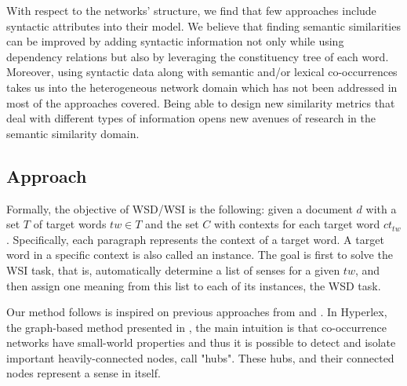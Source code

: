 With respect to the networks' structure, we find that few approaches include syntactic attributes into their model. We believe that finding semantic similarities can be improved by adding syntactic information not only  while using dependency relations but also by leveraging the constituency tree of each word. Moreover, using syntactic data along with semantic and/or lexical co-occurrences takes us into the heterogeneous network domain which has not been addressed in most of the approaches covered.
Being able to design new similarity metrics that deal with different types of information opens new avenues of research in the semantic similarity domain. %




\subsection{Approach}
	


Formally, the objective of WSD/WSI is the following: given a document $d$ with a set $T$ of  target words $tw \in T$ and the set $C$ with contexts for each target word $ct_{tw}$. 
Specifically, each paragraph represents the context  of a target word. A target word in a specific context is also called an instance.
The goal is first to solve the WSI task, that is, automatically determine a list of senses for a given $tw$, and then assign one meaning from this list to each of its instances, the WSD task.
%


Our method follows is inspired on previous approaches from \cite{2004.Veronis} and \cite{2007.Klapaftis.UOY}. In Hyperlex,  the graph-based  method presented  in \cite{2004.Veronis}, the main intuition is that co-occurrence networks have small-world properties and thus it is possible to detect and isolate important heavily-connected nodes, call "hubs". These hubs, and their connected nodes represent a sense in itself. 

